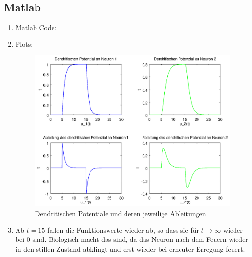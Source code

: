 \documentclass[DIN, pagenumber=false, fontsize=11pt, parskip=half]{scrartcl}
\begin{document}
    \subsection{Matlab}
    \begin{enumerate}[label=(\alph*)]
        \item Matlab Code:
            
        
        \item Plots:
            \begin{figure}[H]
                \centering
                \includegraphics[trim = {0 9cm 27cm 0}, clip,width=\textwidth]{Plot}
                \caption{Dendritischen Potentiale und deren jeweilige Ableitungen}
            \end{figure} 

        \item Ab $t=15$ fallen die Funktionswerte wieder ab, so dass sie für $t \to \infty$ wieder bei $0$ sind. Biologisch macht das sind, da das Neuron nach dem
            Feuern wieder in den stillen Zustand abklingt und erst wieder bei erneuter Erregung feuert.
    \end{enumerate}
\end{document}
